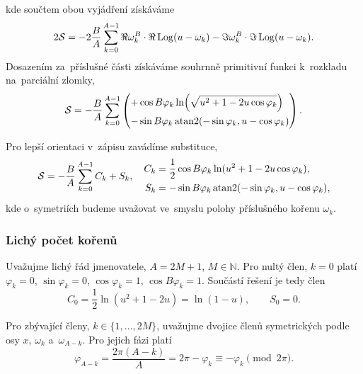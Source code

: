 kde součtem obou vyjádření získáváme
\begin{equation}
    2\mathcal{S}=-2\frac{B}{A}\sum_{k=0}^{A-1}\Re\omega_{k}^B\cdot\Re\operatorname{Log}(u-\omega_{k})-\Im\omega_{k}^{B}\cdot\Im\operatorname{Log}(u-\omega_{k}).
\end{equation}
Dosazením za~příslušné části získáváme souhrnně primitivní funkci k~rozkladu na~parciální zlomky,
\begin{equation}
    \mathcal{S}=-\frac{B}{A}\sum_{k=0}^{A-1}\left(
        \begin{aligned}+&\cos{B\varphi_k}\ln\!\left(\sqrt{u^2+1-2u\cos\varphi_k}\right)\\
            -&\sin{B\varphi_k}\operatorname{atan2}(-\sin\varphi_k,u-\cos\varphi_k)\end{aligned}\right).
\end{equation}

Pro lepší orientaci v~zápisu zavádíme substituce,
\begin{equation}
    \mathcal{S}=-\frac{B}{A}\sum_{k=0}^{A-1}C_k+S_k,\quad \begin{aligned}
    C_k&=\frac{1}{2}\cos{B\varphi_k} \ln(u^2+1-2u\cos{\varphi_k}),\\
    S_k&=-\sin{B\varphi_k}\operatorname{atan2}(-\sin{\varphi_k},u-\cos{\varphi_k}),
    \end{aligned}
\end{equation}
kde o~symetriích budeme uvažovat ve~smyslu polohy příslušného kořenu $\omega_k$.

\subsubsection{Lichý počet kořenů}\label{sss:lichy_pocet_korenu}
Uvažujme lichý řád jmenovatele, $A=2M+1$, $M\in\mathbb{N}$. Pro nultý člen, $k=0$ platí $\varphi_k=0$, $\sin{\varphi_k}=0$, $\cos{\varphi_k}=1$, $\cos{B\varphi_k}=1$. Součástí řešení je tedy člen
\begin{equation}
    C_0=\frac{1}{2}\ln(u^2+1-2u)=\ln(1-u),\qquad S_0=0.
\end{equation}

Pro zbývající členy, $k\in\{1,\dots,2M\}$, uvažujme dvojice členů symetrických podle osy $x$, $\omega_k$ a~$\omega_{A-k}$. Pro jejich fázi platí
\begin{equation}
    \varphi_{A-k}=\frac{2\pi(A-k)}{A}=2\pi-\varphi_k\equiv-\varphi_k\pmod {2\pi}.
\end{equation}


